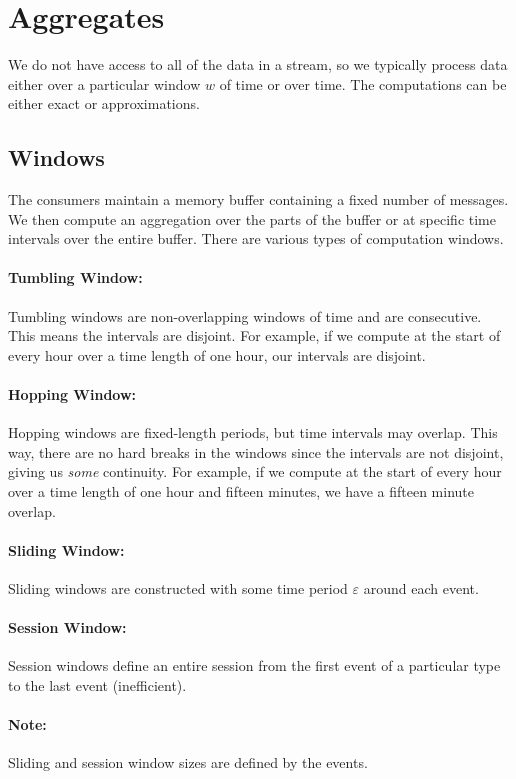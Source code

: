 \documentclass{report}
\renewcommand{\it}[1]{\textit{{#1}}}
\begin{document}
\section{Aggregates}
We do not have access to all of the data in a stream, so we typically process
data either over a particular window $w$ of time or over time. The
computations can be either exact or approximations.

\subsection{Windows}
The consumers maintain a memory buffer containing a fixed number of messages. We
then compute an aggregation over the parts of the buffer or at specific time
intervals over the entire buffer. There are various types of computation windows.

\paragraph{Tumbling Window:} Tumbling windows are non-overlapping windows of
time and are consecutive. This means the intervals are disjoint. For example, if
we compute at the start of every hour over a time length of one hour, our
intervals are disjoint.

\paragraph{Hopping Window:} Hopping windows are fixed-length periods, but time
intervals may overlap. This way, there are no hard breaks in the windows since
the intervals are not disjoint, giving us \it{some} continuity. For example, if
we compute at the start of every hour over a time length of one hour and fifteen
minutes, we have a fifteen minute overlap.

\paragraph{Sliding Window:} Sliding windows are constructed with some time
period $\varepsilon$ around each event.

\paragraph{Session Window:} Session windows define an entire session from the
first event of a particular type to the last event (inefficient).

\paragraph{Note:} Sliding and session window sizes are defined by the events.
\end{document}
